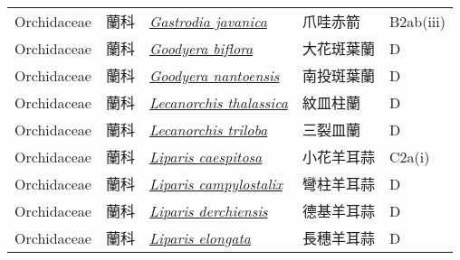 {\begin{longtable}{L{2.5cm}L{2cm}L{5cm}L{2.5cm}L{3cm}}
    Orchidaceae & 蘭科 & \href{http://www.theplantlist.org/tpl1.1/search?q=Gastrodia+javanica}{\textit{Gastrodia javanica} } & 爪哇赤箭 & B2ab(iii)    \\
    Orchidaceae & 蘭科 & \href{http://www.theplantlist.org/tpl1.1/search?q=Goodyera+biflora}{\textit{Goodyera biflora} } & 大花斑葉蘭 & D    \\
    Orchidaceae & 蘭科 & \href{http://www.theplantlist.org/tpl1.1/search?q=Goodyera+nantoensis}{\textit{Goodyera nantoensis} } & 南投斑葉蘭 & D    \\
    Orchidaceae & 蘭科 & \href{http://www.theplantlist.org/tpl1.1/search?q=Lecanorchis+thalassica}{\textit{Lecanorchis thalassica} } & 紋皿柱蘭 & D    \\
    Orchidaceae & 蘭科 & \href{http://www.theplantlist.org/tpl1.1/search?q=Lecanorchis+triloba}{\textit{Lecanorchis triloba} } & 三裂皿蘭 & D    \\
    Orchidaceae & 蘭科 & \href{http://www.theplantlist.org/tpl1.1/search?q=Liparis+caespitosa}{\textit{Liparis caespitosa} } & 小花羊耳蒜 & C2a(i)    \\
    Orchidaceae & 蘭科 & \href{http://www.theplantlist.org/tpl1.1/search?q=Liparis+campylostalix}{\textit{Liparis campylostalix} } & 彎柱羊耳蒜 & D    \\
    Orchidaceae & 蘭科 & \href{http://www.theplantlist.org/tpl1.1/search?q=Liparis+derchiensis}{\textit{Liparis derchiensis} } & 德基羊耳蒜 & D    \\
    Orchidaceae & 蘭科 & \href{http://www.theplantlist.org/tpl1.1/search?q=Liparis+elongata}{\textit{Liparis elongata} } & 長穗羊耳蒜 & D    \\

\end{longtable}}
